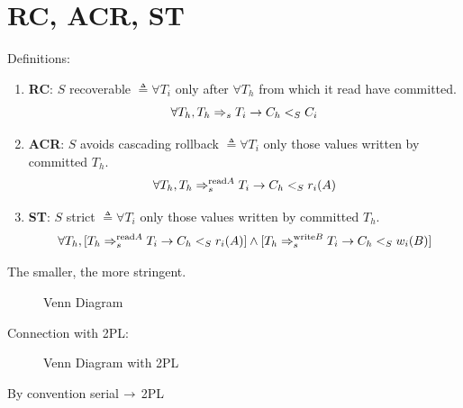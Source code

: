 \documentclass[a4paper]{report}
\begin{document}
\section{RC, ACR, ST}
Definitions:
\begin{enumerate}
\item \textbf{RC}: $S$ recoverable $\triangleq \forall T_i$  only after $\forall T_h$ from which it read have committed. 
$$
\forall T_h, T_h \Rightarrow_s T_i \rightarrow C_h <_S C_i
$$
\item \textbf{ACR}: $S$ avoids cascading rollback $\triangleq \forall T_i$  only those values written by committed $T_h$. 
$$
\forall T_h, T_h \Rightarrow_s^{\text{read} A} T_i \rightarrow C_h <_S r_i (A)
$$
\item \textbf{ST}: $S$ strict $\triangleq \forall T_i$  only those values written by committed $T_h$.
$$
\forall T_h, [T_h \Rightarrow_s^{\text{read} A} T_i \rightarrow C_h <_S r_i(A)] \wedge[T_h \Rightarrow_s^{\text{write} B} T_i \rightarrow C_h <_S w_i(B)]
$$
\end{enumerate}

The smaller, the more stringent. 
 
\begin{figure}[H]
\centering
{}
\caption{Venn Diagram}
\label{fig:FRCCDiagram}
\end{figure}
Connection with 2PL:
\begin{figure}[H]
\centering
{}
\caption{Venn Diagram with 2PL}
\label{fig:FRCCDiagram}
\end{figure}
By convention serial $\rightarrow$ 2PL
\end{document}
